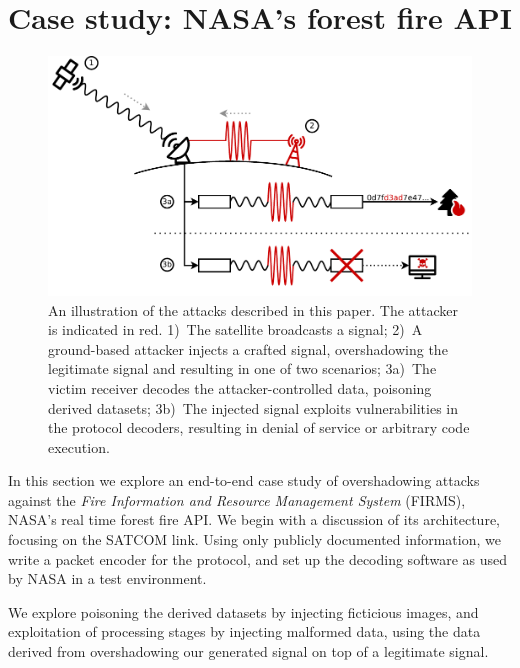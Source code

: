 \section{Case study: NASA's forest fire API}\label{sec:attack}

\begin{figure}
  \centering
  \includegraphics[width=\columnwidth]{diagrams/attack_illustration.pdf}
  \caption{An illustration of the attacks described in this paper. The attacker is indicated in red. 1)~The satellite broadcasts a signal; 2)~A ground-based attacker injects a crafted signal, overshadowing the legitimate signal and resulting in one of two scenarios; 3a)~The victim receiver decodes the attacker-controlled data, poisoning derived datasets; 3b)~The injected signal exploits vulnerabilities in the protocol decoders, resulting in denial of service or arbitrary code execution.}
  \label{fig:attack-illustration}
\end{figure}


In this section we explore an end-to-end case study of overshadowing attacks against the \textit{Fire Information and Resource Management System} (FIRMS), NASA's real time forest fire API.
We begin with a discussion of its architecture, focusing on the SATCOM link.
Using only publicly documented information, we write a packet encoder for the protocol, and set up the decoding software as used by NASA in a test environment.

We explore poisoning the derived datasets by injecting ficticious images, and exploitation of processing stages by injecting malformed data, using the data derived from overshadowing our generated signal on top of a legitimate signal.

